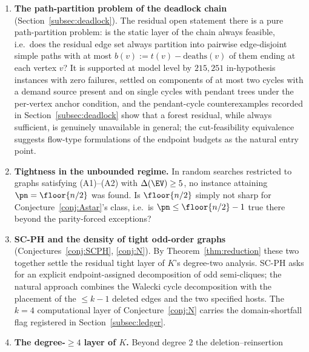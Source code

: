 \begin{enumerate}[label=\textbf{O\arabic*.},leftmargin=2.4em]
single band). Outside the constructed family, far--far edges and multiple parity leaves can be
admitted, while cycle-bearing odd-neighbour blocks are genuine obstructions --- the first
known counterexamples to the general band-free statement. The residue of the conjecture is
this corner (at gap $\ge3$ within the family) together with the graphs of at least three high
vertices that are neither separated nor covered by the profile parity of Remark~\ref{rem:CO};
any full proof must import endpoint-budget ideas
(Section~\ref{sec:conditional}) into the Fan engine.
\item \textbf{The path-partition problem of the deadlock chain}
(Section~\ref{subsec:deadlock}). The residual open statement there is a pure path-partition
problem: is the static layer of the chain always feasible, i.e.\ does the residual edge set
always partition into pairwise edge-disjoint simple paths with at most
$b(v):=t(v)-\mathrm{deaths}(v)$ of them ending at each vertex $v$? It is supported at model
level by $215{,}251$ in-hypothesis instances with zero failures, settled on components of at
most two cycles with a demand source present and on single cycles with pendant trees under the
per-vertex anchor condition, and the pendant-cycle counterexamples recorded in
Section~\ref{subsec:deadlock} show that a forest residual, while always sufficient, is
genuinely unavailable in general; the cut-feasibility equivalence suggests flow-type
formulations of the endpoint budgets as the natural entry point.
\item \textbf{Tightness in the unbounded regime.} In random searches restricted to graphs
satisfying (A1)--(A2) with $\Delta(\EV)\ge5$, no instance attaining $\pn=\floor{n/2}$ was
found. Is $\floor{n/2}$ simply not sharp for Conjecture~\ref{conj:Astar}'s class, i.e.\ is
$\pn\le\floor{n/2}-1$ true there beyond the parity-forced exceptions?
\item \textbf{SC-PH and the density of tight odd-order graphs}
(Conjectures~\ref{conj:SCPH}, \ref{conj:N}). By Theorem~\ref{thm:reduction} these two
together settle the residual tight layer of $K$'s degree-two analysis. SC-PH asks for an
explicit endpoint-assigned decomposition of odd semi-cliques; the natural approach combines
the Walecki cycle decomposition with the placement of the $\le k-1$ deleted edges and the two
specified hosts. The $k=4$ computational layer of Conjecture~\ref{conj:N} carries the
domain-shortfall flag registered in Section~\ref{subsec:ledger}.
\item \textbf{The degree-$\ge4$ layer of $K$.} Beyond degree $2$ the deletion--reinsertion

\end{enumerate}
